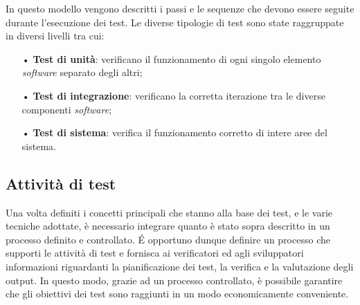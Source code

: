 In questo modello vengono descritti i passi e le sequenze che devono essere seguite durante l'esecuzione dei test. Le diverse tipologie di test sono state raggruppate in diversi livelli tra cui:
\begin{itemize}
\item[•] \textbf{Test di unità}: verificano il funzionamento di ogni singolo elemento \textit{software} separato degli altri;

\item[•] \textbf{Test di integrazione}: verificano la corretta iterazione tra le diverse componenti \textit{software};

\item[•] \textbf{Test di sistema}: verifica il funzionamento corretto di intere aree del sistema.
\end{itemize}

\subsection{Attività di test}

Una volta definiti i concetti principali che stanno alla base dei test, e le varie tecniche adottate, è necessario integrare quanto è stato sopra descritto in un processo definito e controllato. É opportuno dunque definire un processo che supporti le attività di test e fornisca ai verificatori ed agli sviluppatori informazioni riguardanti la pianificazione dei test, la verifica e la valutazione degli output. In questo modo, grazie ad un processo controllato, è possibile garantire che gli obiettivi dei test sono raggiunti in un modo economicamente conveniente.

